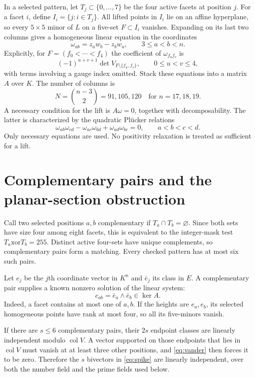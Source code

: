 \documentclass[11pt]{article}
\theoremstyle{definition}
\begin{document}
In a selected pattern, let $T_j\subset\{0,\ldots,7\}$ be the four active facets at position $j$. For a facet $i$, define $I_i=\{j:i\in T_j\}$. All lifted points in $I_i$ lie on an affine hyperplane, so every $5\times5$ minor of $L$ on a five-set $F\subset I_i$ vanishes. Expanding on its last two columns gives a homogeneous linear equation in the coordinates
\[
 \omega_{ab}=z_aw_b-z_bw_a,\qquad 3\le a<b<n.
\]
Explicitly, for $F=(f_0<\cdots<f_4)$ the coefficient of $\omega_{f_u f_v}$ is
\begin{equation}\label{eq:A}
 (-1)^{u+v+1}\det V_{F\setminus\{f_u,f_v\}},
 \qquad 0\le u<v\le4,
\end{equation}
with terms involving a gauge index omitted. Stack these equations into a matrix $A$ over $K$. The number of columns is
\[
 N=\binom{n-3}{2}=91,105,120\quad\text{for }n=17,18,19.
\]
A necessary condition for the lift is $A\omega=0$, together with decomposability. The latter is characterized by the quadratic Pl\"ucker relations
\begin{equation}\label{eq:plucker}
 \omega_{ab}\omega_{cd}-\omega_{ac}\omega_{bd}
       +\omega_{ad}\omega_{bc}=0,
 \qquad a<b<c<d.
\end{equation}
Only necessary equations are used. No positivity relaxation is treated as sufficient for a lift.

\section{Complementary pairs and the planar-section obstruction}
Call two selected positions $a,b$ complementary if $T_a\cap T_b=\varnothing$. Since both sets have size four among eight facets, this is equivalent to the integer-mask test $T_a\mathbin{\mathrm{xor}}T_b=255$. Distinct active four-sets have unique complements, so complementary pairs form a matching. Every checked pattern has at most six such pairs.

Let $e_j$ be the $j$th coordinate vector in $K^n$ and $\bar e_j$ its class in $E$. A complementary pair supplies a known nonzero solution of the linear system:
\begin{equation}\label{eq:spike}
 c_{ab}=\bar e_a\wedge\bar e_b\in\ker A.
\end{equation}
Indeed, a facet contains at most one of $a,b$. If the heights are $e_a,e_b$, its selected homogeneous points have rank at most four, so all its five-minors vanish.

If there are $s\le6$ complementary pairs, their $2s$ endpoint classes are linearly independent modulo $\operatorname{col}V$. A vector supported on those endpoints that lies in $\operatorname{col}V$ must vanish at at least three other positions, and \eqref{eq:vander} then forces it to be zero. Therefore the $s$ bivectors in \eqref{eq:spike} are linearly independent, over both the number field and the prime fields used below.
\end{document}
